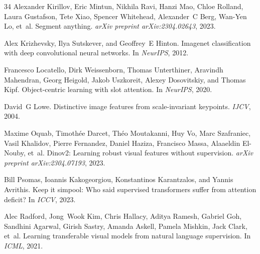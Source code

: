 \documentclass{article} \usepackage{iclr2024_conference,times}
\begin{document}
\begin{thebibliography}{34}
Alexander Kirillov, Eric Mintun, Nikhila Ravi, Hanzi Mao, Chloe Rolland, Laura
  Gustafson, Tete Xiao, Spencer Whitehead, Alexander~C Berg, Wan-Yen Lo, et~al.
\newblock Segment anything.
\newblock \emph{arXiv preprint arXiv:2304.02643}, 2023.

Alex Krizhevsky, Ilya Sutskever, and Geoffrey~E Hinton.
\newblock Imagenet classification with deep convolutional neural networks.
\newblock In \emph{NeurIPS}, 2012.

Francesco Locatello, Dirk Weissenborn, Thomas Unterthiner, Aravindh Mahendran,
  Georg Heigold, Jakob Uszkoreit, Alexey Dosovitskiy, and Thomas Kipf.
\newblock Object-centric learning with slot attention.
\newblock In \emph{NeurIPS}, 2020.

David~G Lowe.
\newblock Distinctive image features from scale-invariant keypoints.
\newblock \emph{IJCV}, 2004.

Maxime Oquab, Timoth{\'e}e Darcet, Th{\'e}o Moutakanni, Huy Vo, Marc
  Szafraniec, Vasil Khalidov, Pierre Fernandez, Daniel Haziza, Francisco Massa,
  Alaaeldin El-Nouby, et~al.
\newblock Dinov2: Learning robust visual features without supervision.
\newblock \emph{arXiv preprint arXiv:2304.07193}, 2023.

Bill Psomas, Ioannis Kakogeorgiou, Konstantinos Karantzalos, and Yannis
  Avrithis.
\newblock Keep it simpool: Who said supervised transformers suffer from
  attention deficit?
\newblock In \emph{ICCV}, 2023.

Alec Radford, Jong~Wook Kim, Chris Hallacy, Aditya Ramesh, Gabriel Goh,
  Sandhini Agarwal, Girish Sastry, Amanda Askell, Pamela Mishkin, Jack Clark,
  et~al.
\newblock Learning transferable visual models from natural language
  supervision.
\newblock In \emph{ICML}, 2021.


\end{thebibliography}
\end{document}

